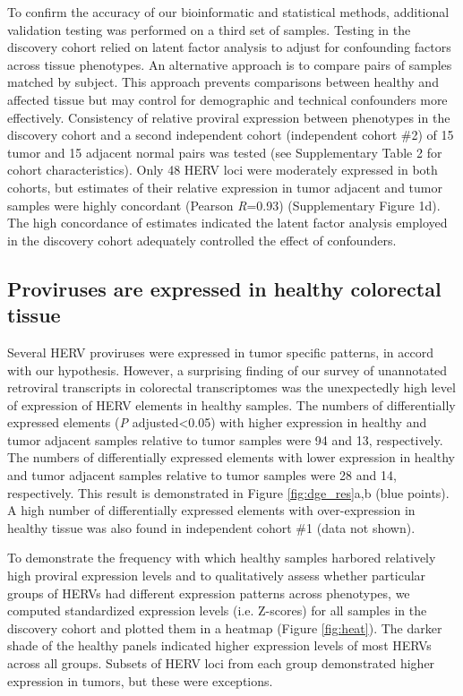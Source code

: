 To confirm the accuracy of our bioinformatic and statistical methods, additional validation testing was performed on a third set of samples.
Testing in the discovery cohort relied on latent factor analysis to adjust for confounding factors across tissue phenotypes.
An alternative approach is to compare pairs of samples matched by subject.
This approach prevents comparisons between healthy and affected tissue but may control for demographic and technical confounders more effectively.
Consistency of relative proviral expression between phenotypes in the discovery cohort and a second independent cohort (independent cohort \#2) of 15 tumor and 15 adjacent normal pairs was tested (see Supplementary Table 2 for cohort characteristics).
Only 48 HERV loci were moderately expressed in both cohorts, but estimates of their relative expression in tumor adjacent and tumor samples were highly concordant (Pearson \emph{R}=0.93) (Supplementary Figure 1d).
The high concordance of estimates indicated the latent factor analysis employed in the discovery cohort adequately controlled the effect of confounders.

\subsection*{Proviruses are expressed in healthy colorectal tissue}
Several HERV proviruses were expressed in tumor specific patterns, in accord with our hypothesis.
However, a surprising finding of our survey of unannotated retroviral transcripts in colorectal transcriptomes was the unexpectedly high level of expression of HERV elements in healthy samples.
The numbers of differentially expressed elements (\emph{P} adjusted<0.05) with higher expression in healthy and tumor adjacent samples relative to tumor samples were 94 and 13, respectively.
The numbers of differentially expressed elements with lower expression in healthy and tumor adjacent samples relative to tumor samples were 28 and 14, respectively.
This result is demonstrated in Figure \ref{fig:dge_res}a,b (blue points).
A high number of differentially expressed elements with over-expression in healthy tissue was also found in independent cohort \#1 (data not shown).

To demonstrate the frequency with which healthy samples harbored relatively high proviral expression levels and to qualitatively assess whether particular groups of HERVs had different expression patterns across phenotypes, we computed standardized expression levels (i.e. Z-scores) for all samples in the discovery cohort and plotted them in a heatmap (Figure \ref{fig:heat}).
The darker shade of the healthy panels indicated higher expression levels of most HERVs across all groups.
Subsets of HERV loci from each group demonstrated higher expression in tumors, but these were exceptions.

